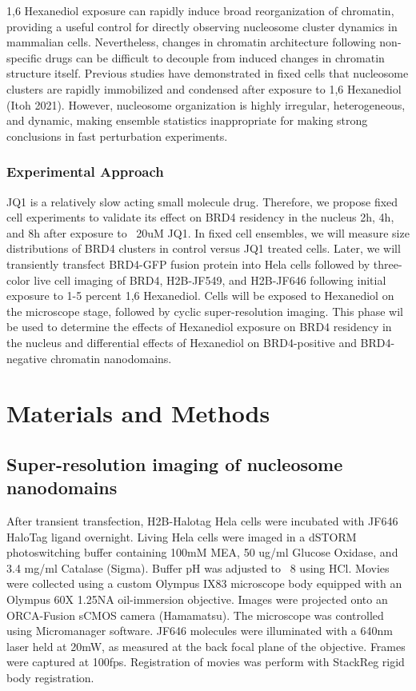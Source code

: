 \documentclass{ucetd}
\begin{document}
1,6 Hexanediol exposure can rapidly induce broad reorganization of chromatin, providing a useful control for directly observing nucleosome cluster dynamics in mammalian cells. Nevertheless, changes in chromatin architecture following non-specific drugs can be difficult to decouple from induced changes in chromatin structure itself. Previous studies have demonstrated in fixed cells that nucleosome clusters are rapidly immobilized and condensed after exposure to 1,6 Hexanediol (Itoh 2021). However, nucleosome organization is highly irregular, heterogeneous, and dynamic, making ensemble statistics inappropriate for making strong conclusions in fast perturbation experiments. 

\subsubsection{Experimental Approach}

JQ1 is a relatively slow acting small molecule drug. Therefore, we propose fixed cell experiments to validate its effect on BRD4 residency in the nucleus 2h, 4h, and 8h after exposure to ~20uM JQ1. In fixed cell ensembles, we will measure size distributions of BRD4 clusters in control versus JQ1 treated cells. Later, we will transiently transfect BRD4-GFP fusion protein into Hela cells followed by three-color live cell imaging of BRD4, H2B-JF549, and H2B-JF646 following initial exposure to 1-5 percent 1,6 Hexanediol. Cells will be exposed to Hexanediol on the microscope stage, followed by cyclic super-resolution imaging. This phase wil be used to determine the effects of Hexanediol exposure on BRD4 residency in the nucleus and differential effects of Hexanediol on BRD4-positive and BRD4-negative chromatin nanodomains. 

\section{Materials and Methods}

\subsection{Super-resolution imaging of nucleosome nanodomains}

After transient transfection, H2B-Halotag Hela cells were incubated with JF646 HaloTag ligand overnight. Living Hela cells were imaged in a dSTORM photoswitching buffer containing 100mM MEA, 50 ug/ml Glucose Oxidase, and 3.4 mg/ml Catalase (Sigma). Buffer pH was adjusted to ~8 using HCl. Movies were collected using a custom Olympus IX83 microscope body equipped with an Olympus 60X 1.25NA oil-immersion objective. Images were projected onto an ORCA-Fusion sCMOS camera (Hamamatsu). The microscope was controlled using Micromanager software. JF646 molecules were illuminated with a 640nm laser held at 20mW, as measured at the back focal plane of the objective.  Frames were captured at 100fps. Registration of movies was perform with StackReg rigid body registration. 
\end{document}
